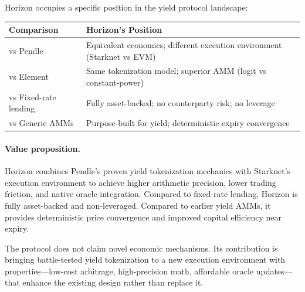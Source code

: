 Horizon occupies a specific position in the yield protocol landscape:

\begin{center}
\begin{tabularx}{\textwidth}{l >{\raggedright\arraybackslash}X}
\toprule
\textbf{Comparison} & \textbf{Horizon's Position} \\
\midrule
vs Pendle & Equivalent economics; different execution environment (Starknet vs EVM) \\
vs Element & Same tokenization model; superior AMM (logit vs constant-power) \\
vs Fixed-rate lending & Fully asset-backed; no counterparty risk; no leverage \\
vs Generic AMMs & Purpose-built for yield; deterministic expiry convergence \\
\bottomrule
\end{tabularx}
\end{center}

\paragraph{Value proposition.}
Horizon combines Pendle's proven yield tokenization mechanics with Starknet's execution environment to achieve higher arithmetic precision, lower trading friction, and native oracle integration. Compared to fixed-rate lending, Horizon is fully asset-backed and non-leveraged. Compared to earlier yield AMMs, it provides deterministic price convergence and improved capital efficiency near expiry.

The protocol does not claim novel economic mechanisms. Its contribution is bringing battle-tested yield tokenization to a new execution environment with properties---low-cost arbitrage, high-precision math, affordable oracle updates---that enhance the existing design rather than replace it.

